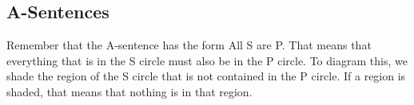 
\subsection{A-Sentences}

Remember that the A-sentence has the form All S are P. That means that everything that is in the S circle must also be in the P circle. To diagram this, we shade the region of the S circle that is not contained in the P circle. If a region is shaded, that means that nothing is in that region.



